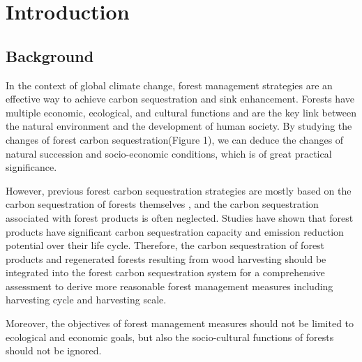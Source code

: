 
\newpage

\section{Introduction}

\subsection{Background}

In the context of global climate change, forest management strategies are an effective way to achieve carbon sequestration and sink enhancement. Forests have multiple economic, ecological, and cultural functions and are the key link between the natural environment and the development of human society.\cite{LalR} By studying the changes of forest carbon sequestration(Figure 1), we can deduce the changes of natural succession and socio-economic conditions, which is of great practical significance.

However, previous forest carbon sequestration strategies are mostly based on the carbon sequestration of forests themselves\cite{landsat7,urbanforest}  , and the carbon sequestration associated with forest products is often neglected. Studies\cite{WoodProducts}  have shown that forest products have significant carbon sequestration capacity and emission reduction potential over their life cycle. Therefore, the carbon sequestration of forest products and regenerated forests resulting from wood harvesting should be integrated into the forest carbon sequestration system for a comprehensive assessment to derive more reasonable forest management measures including harvesting cycle and harvesting scale.

Moreover, the objectives of forest management measures should not be limited to ecological and economic goals, but also the socio-cultural functions of forests should not be ignored. 

